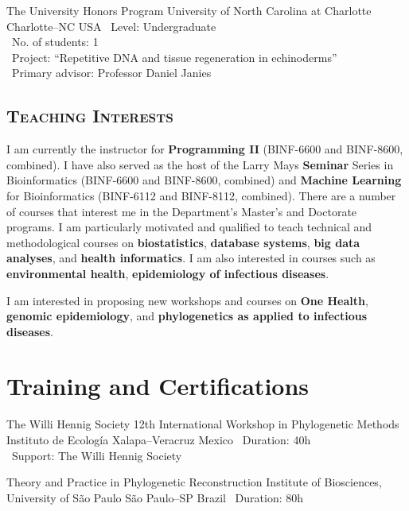 \documentclass[11pt, letterpaper, sans]{moderncv}
\begin{document}
\cventry{---}
{The University Honors Program}
{University of North Carolina at Charlotte}
{Charlotte--NC}
{USA}
{
	\textbullet~Level: Undergraduate\\
	\textbullet~No. of students: 1\\
	\textbullet~Project: ``Repetitive DNA and tissue regeneration in echinoderms''\\
	\textbullet~Primary advisor: Professor Daniel Janies\\
}

\vspace{.5em}
	\subsection{\textsc{Teaching Interests}}
\vspace{.5em}

I am currently the instructor for \textbf{Programming II} (BINF-6600 and BINF-8600, combined). I have also served as the host of the Larry Mays \textbf{Seminar} Series in Bioinformatics (BINF-6600 and BINF-8600, combined) and \textbf{Machine Learning} for Bioinformatics (BINF-6112 and BINF-8112, combined). There are a number of courses that interest me in the Department's Master's and Doctorate programs. I am particularly motivated and qualified to teach technical and methodological courses on \textbf{biostatistics}, \textbf{database systems}, \textbf{big data analyses}, and \textbf{health informatics}. I am also interested in courses such as \textbf{environmental health}, \textbf{epidemiology of infectious diseases}.

\vspace{0.5em}

I am interested in proposing new workshops and courses on \textbf{One Health}, \textbf{genomic epidemiology}, and \textbf{phylogenetics as applied to infectious diseases}.


\section{Training and Certifications}
		{The Willi Hennig Society 12th International Workshop in Phylogenetic Methods}
		{Instituto de Ecología}
		{Xalapa--Veracruz}
		{Mexico}
		{
			\textbullet~Duration: 40h\\
			\textbullet~Support: The Willi Hennig Society
		}

		{Theory and Practice in Phylogenetic Reconstruction}
		{Institute of Biosciences, University of São Paulo}
		{São Paulo--SP}
		{Brazil}
		{
			\textbullet~Duration: 80h
		}
\end{document}
